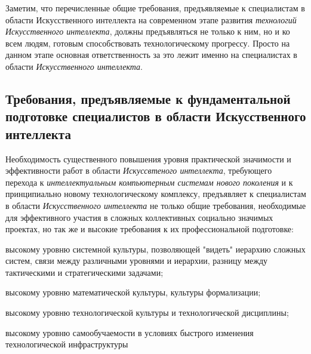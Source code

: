 Заметим, что перечисленные общие требования, предъявляемые к специалистам в области Искусственного интеллекта на современном этапе развития \textit{технологий Искусственного интеллекта}, должны предъявляться не только к ним, но и ко всем людям, готовым способствовать технологическому прогрессу. Просто на данном этапе основная ответственность за это лежит именно на специалистах в области \textit{Искусственного интеллекта}.

\subsection*{Требования, предъявляемые к фундаментальной подготовке специалистов в области Искусственного интеллекта}
Необходимость существенного повышения уровня практической значимости и эффективности работ в области \textit{Искуссвтеного интеллекта}, требующего перехода к \textit{интеллектуальным компьютерным системам нового поколения} и к принципиально новому технологическому комплексу, предъявляет к специалистам в области \textit{Искусственного интеллекта} не только общие требования, необходимые для эффективного участия в сложных коллективных социально значимых проектах, но так же и высокие требования к их  профессиональной подготовке:
\begin{textitemize}
	\item высокому уровню системной культуры, позволяющей "видеть"{} иерархию сложных систем, связи между различными уровнями и иерархии, разницу между тактическими и стратегическими задачами;
	\item высокому уровню математической культуры, культуры формализации;
	\item высокому уровню технологической культуры и технологической дисциплины;
	\item высокому уровню самообучаемости в условиях быстрого изменения технологической инфраструктуры
\end{textitemize}

